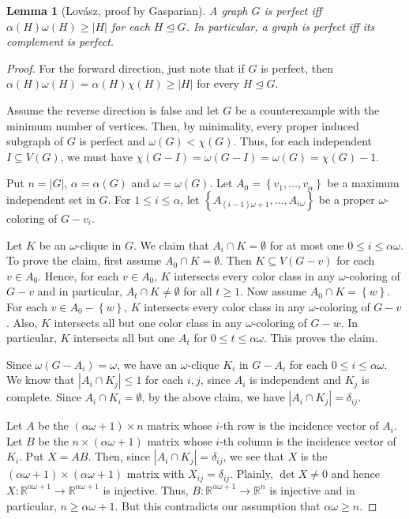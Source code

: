 \documentclass[12pt]{article}
\theoremstyle{plain}
\newtheorem{lem}[thm]{Lemma}
\theoremstyle{definition}
\theoremstyle{remark}
\newcommand{\set}[1]{\left\{ #1 \right\}}
\newcommand{\card}[1]{\left|#1\right|}
\begin{document}
\begin{lem}[Lov{\'a}sz, proof by Gasparian]\label{ComplementOfPerfectGraph}
A graph $G$ is perfect iff $\alpha(H)\omega(H) \geq \card{H}$ for each $H \unlhd G$.  In particular, a graph is perfect iff its complement is perfect.
\end{lem}
\begin{proof}
For the forward direction, just note that if $G$ is perfect, then $\alpha(H)\omega(H) = \alpha(H)\chi(H) \geq \card{H}$ for every $H \unlhd G$.

Assume the reverse direction is false and let $G$ be a counterexample with the minimum number of vertices.  Then, by minimality, every proper induced subgraph of $G$ is perfect and $\omega(G) < \chi(G)$.  Thus, for each independent $I \subseteq V(G)$, we must have $\chi(G-I) = \omega(G-I) = \omega(G) = \chi(G) - 1$.

Put $n = \card{G}$, $\alpha = \alpha(G)$ and $\omega = \omega(G)$.  Let $A_0 = \set{v_1, \ldots, v_\alpha}$ be a maximum independent set in $G$.  For $1 \leq i \leq \alpha$, let $\set{A_{(i - 1)\omega + 1}, \ldots, A_{i\omega}}$ be a proper $\omega$-coloring of $G - v_i$.  

Let $K$ be an $\omega$-clique in $G$.  We claim that $A_i \cap K = \emptyset$ for at most one $0 \leq i \leq \alpha\omega$.  To prove the claim, first assume $A_0 \cap K = \emptyset$. Then $K \subseteq V(G - v)$ for each $v \in A_0$.  Hence, for each $v \in A_0$, $K$ intersects every color class in any $\omega$-coloring of $G-v$ and in particular, $A_t \cap K \neq \emptyset$ for all $t \geq 1$.  Now assume $A_0 \cap K = \set{w}$. For each $v \in A_0 - \set{w}$, $K$ intersects every color class in any $\omega$-coloring of $G-v$.  Also, $K$ intersects all but one color class in any $\omega$-coloring of $G-w$.  In particular, $K$ intersects all but one $A_t$ for $0 \leq t \leq \alpha\omega$.  This proves the claim.

Since $\omega(G-A_i) = \omega$, we have an $\omega$-clique $K_i$ in $G - A_i$ for each $0 \leq i \leq \alpha\omega$.  We know that $\card{A_i \cap K_j} \leq 1$ for each $i, j$, since $A_i$ is independent and $K_j$ is complete. Since $A_i \cap K_i = \emptyset$, by the above claim, we have $\card{A_i \cap K_j} = \delta_{ij}$.

Let $A$ be the $(\alpha\omega + 1) \times n$ matrix whose $i$-th row is the incidence vector of $A_i$.  Let $B$ be the $n \times (\alpha\omega + 1)$ matrix whose $i$-th column is the incidence vector of $K_i$.  Put $X = AB$.  Then, since $\card{A_i \cap K_j} = \delta_{ij}$, we see that $X$ is the $(\alpha\omega + 1) \times (\alpha\omega + 1)$ matrix with $X_{ij} = \delta_{ij}$. Plainly, $\det X \neq 0$ and hence $X\colon \mathbb{R}^{\alpha\omega + 1} \rightarrow \mathbb{R}^{\alpha\omega + 1}$ is injective.  Thus, $B\colon \mathbb{R}^{\alpha\omega + 1} \rightarrow \mathbb{R}^n$ is injective and in particular, $n \geq \alpha\omega + 1$.  But this contradicts our assumption that $\alpha\omega \geq n$.
\end{proof}
\end{document}
